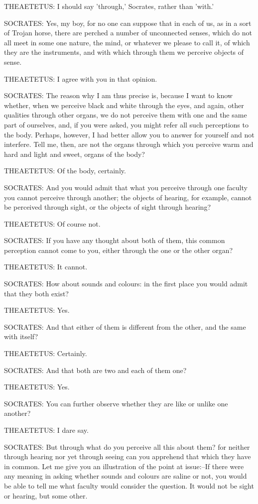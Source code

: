 THEAETETUS: I should say 'through,' Socrates, rather than 'with.'

SOCRATES: Yes, my boy, for no one can suppose that in each of us, as
in a sort of Trojan horse, there are perched a number of unconnected
senses, which do not all meet in some one nature, the mind, or whatever
we please to call it, of which they are the instruments, and with which
through them we perceive objects of sense.

THEAETETUS: I agree with you in that opinion.

SOCRATES: The reason why I am thus precise is, because I want to know
whether, when we perceive black and white through the eyes, and again,
other qualities through other organs, we do not perceive them with one
and the same part of ourselves, and, if you were asked, you might refer
all such perceptions to the body. Perhaps, however, I had better allow
you to answer for yourself and not interfere. Tell me, then, are not
the organs through which you perceive warm and hard and light and sweet,
organs of the body?

THEAETETUS: Of the body, certainly.

SOCRATES: And you would admit that what you perceive through one
faculty you cannot perceive through another; the objects of hearing,
for example, cannot be perceived through sight, or the objects of sight
through hearing?

THEAETETUS: Of course not.

SOCRATES: If you have any thought about both of them, this common
perception cannot come to you, either through the one or the other
organ?

THEAETETUS: It cannot.

SOCRATES: How about sounds and colours: in the first place you would
admit that they both exist?

THEAETETUS: Yes.

SOCRATES: And that either of them is different from the other, and the
same with itself?

THEAETETUS: Certainly.

SOCRATES: And that both are two and each of them one?

THEAETETUS: Yes.

SOCRATES: You can further observe whether they are like or unlike one
another?

THEAETETUS: I dare say.

SOCRATES: But through what do you perceive all this about them? for
neither through hearing nor yet through seeing can you apprehend that
which they have in common. Let me give you an illustration of the
point at issue:--If there were any meaning in asking whether sounds and
colours are saline or not, you would be able to tell me what faculty
would consider the question. It would not be sight or hearing, but some
other.

